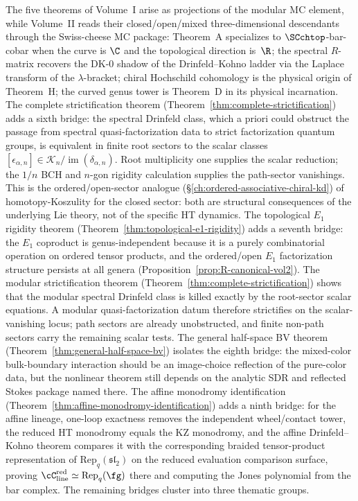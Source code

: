 The five theorems of Volume~I arise as projections of the modular
MC element, while Volume~II reads their closed/open/mixed
three-dimensional descendants through the Swiss-cheese MC package:
Theorem~A specializes to $\SCchtop$-bar-cobar when the curve is
$\C$ and the topological direction is~$\R$;
the spectral $R$-matrix recovers the DK-0 shadow of the
Drinfeld--Kohno ladder via the Laplace transform of the
$\lambda$-bracket;
chiral Hochschild cohomology is the physical origin of Theorem~H;
the curved genus tower is Theorem~D in its physical incarnation.
The complete strictification theorem
(Theorem~\ref{thm:complete-strictification}) adds a sixth bridge:
the spectral Drinfeld class, which a priori could obstruct the
passage from spectral quasi-factorization data to strict factorization quantum groups,
is equivalent in finite root sectors to the scalar classes
$[\epsilon_{\alpha,n}]\in
\mathscr K_n/\operatorname{im}(\delta_{\alpha,n})$. Root
multiplicity one supplies the scalar reduction; the $1/n$ BCH and
$n$-gon rigidity calculation supplies the path-sector vanishings.
This is the ordered/open-sector analogue
(\S\ref{ch:ordered-associative-chiral-kd}) of homotopy-Koszulity for
the closed sector: both are structural consequences of the underlying
Lie theory, not of the specific HT dynamics.
The topological $E_1$ rigidity theorem
(Theorem~\ref{thm:topological-e1-rigidity}) adds a seventh
bridge: the $E_1$ coproduct is genus-independent because it
is a purely combinatorial operation on ordered tensor
products, and the ordered/open $E_1$ factorization structure
persists at all genera
(Proposition~\ref{prop:R-canonical-vol2}). The modular
strictification theorem
(Theorem~\ref{thm:complete-strictification}) shows that the
modular spectral Drinfeld class is killed exactly by the
root-sector scalar equations. A modular quasi-factorization datum
therefore strictifies on the scalar-vanishing locus; path sectors
are already unobstructed, and finite non-path sectors carry the
remaining scalar tests.
The general half-space BV theorem
(Theorem~\ref{thm:general-half-space-bv}) isolates the eighth bridge:
the mixed-color bulk-boundary interaction should be an image-choice
reflection of the pure-color data, but the nonlinear theorem still
depends on the analytic SDR and reflected Stokes package named there.
The affine monodromy identification
(Theorem~\ref{thm:affine-monodromy-identification}) adds a ninth
bridge: for the affine lineage, one-loop exactness removes the
independent wheel/contact tower, the reduced HT monodromy equals the KZ monodromy,
and the affine Drinfeld--Kohno theorem compares it with the
corresponding braided tensor-product representation of
$\mathrm{Rep}_q(\mathfrak{sl}_2)$ on the reduced evaluation
comparison surface, proving
$\cC_{\mathrm{line}}^{\mathrm{red}}\simeq \mathrm{Rep}_q(\fg)$
there and computing
the Jones polynomial from the bar complex.
The remaining bridges cluster into three thematic groups.

